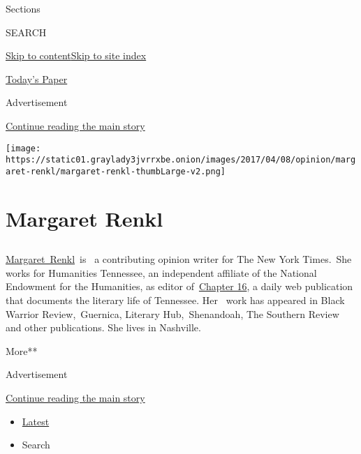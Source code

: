 Sections

SEARCH

\protect\hyperlink{site-content}{Skip to
content}\protect\hyperlink{site-index}{Skip to site index}

\href{https://myaccount.nytimes3xbfgragh.onion/auth/login?response_type=cookie\&client_id=vi}{}

\href{https://www.nytimes3xbfgragh.onion/section/todayspaper}{Today's
Paper}

Advertisement

\protect\hyperlink{after-top}{Continue reading the main story}

\texttt{[image: https://static01.graylady3jvrrxbe.onion/images/2017/04/08/opinion/margaret-renkl/margaret-renkl-thumbLarge-v2.png]}

\hypertarget{margaret-renkl}{%
\section{Margaret Renkl}\label{margaret-renkl}}

\subsection{}

\href{http://margaretrenkl.com/}{Margaret~Renkl}~is~ a contributing
opinion writer for The New York Times.~She works for Humanities
Tennessee, an independent affiliate of the National Endowment for the
Humanities, as editor of~\href{http://chapter16.org/}{Chapter 16}, a
daily web publication that documents the literary life of Tennessee.
Her~ work has appeared in Black Warrior Review,~Guernica, Literary
Hub,~Shenandoah, The Southern Review and other publications. She lives
in Nashville.

More**

Advertisement

\protect\hyperlink{after-mid1}{Continue reading the main story}

\begin{itemize}
\tightlist
\item
  \protect\hyperlink{stream-panel}{Latest}
\item
  Search
\end{itemize}

